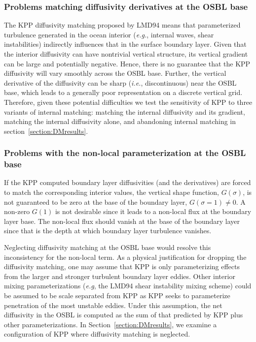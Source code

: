 \documentclass[preprint,12pt,authoryear]{agujournal}
\begin{document}
\subsubsection{Problems matching diffusivity derivatives at the OSBL base}

The KPP diffusivity matching proposed by LMD94 means that parameterized turbulence generated in the ocean interior (\textit{e.g.}, internal waves, shear instabilities) indirectly influences that in the surface boundary layer.  Given that the interior diffusivity can have nontrivial vertical structure, its vertical gradient can be large and potentially negative.  Hence, there is no guarantee that the KPP diffusivity will vary smoothly across the OSBL base.  Further, the vertical derivative of the diffusivity can be sharp (\textit{i.e.}, discontinuous) near the OSBL base, which leads to a generally poor representation on a discrete vertical grid.  Therefore, given these potential difficulties we test the sensitivity of KPP to three variants of internal matching: matching the internal diffusivity and its gradient, matching the internal diffusivity alone, and abandoning internal matching in section~\ref{section:DMresults}. 

\subsubsection{Problems with the non-local parameterization at the OSBL base}

If the KPP computed boundary layer diffusivities (and the derivatives) are forced to match the corresponding interior values, the vertical shape function, $G(\sigma)$, is not guaranteed to be zero at the base of the boundary layer, $G(
\sigma=1) \ne 0$.  A non-zero $G(1)$ is not desirable since it leads to a non-local flux at the boundary layer base. The non-local flux should vanish at the base of the boundary layer since that is the depth at which boundary layer turbulence vanishes. 

Neglecting diffusivity matching at the OSBL base would resolve this inconsistency for the non-local term.  As a physical justification for dropping the diffusivity matching, one may assume that KPP is only parameterizing effects from the larger and stronger turbulent boundary layer eddies.  Other interior mixing parameterizations (\textit{e.g}, the LMD94 shear instability mixing scheme) could be assumed to be scale separated from KPP as KPP seeks to parameterize penetration of the most unstable eddies.  Under this assumption, the net diffusivity in the OSBL is computed as the sum of that predicted by KPP plus other parameterizations.  In Section~\ref{section:DMresults}, we examine a configuration of KPP where diffusivity matching is neglected.
\end{document}
